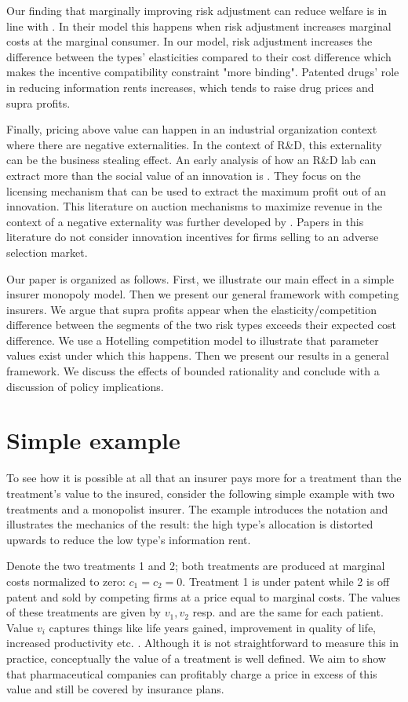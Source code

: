 \documentclass[12pt,english,a4paper]{article}
\begin{document}
Our finding that marginally improving risk adjustment can reduce welfare is in line with \cite{weyl2017}. In their model this happens when risk adjustment increases marginal costs at the marginal consumer. In our model, risk adjustment increases the difference between the types' elasticities  compared to their cost difference which makes the incentive compatibility constraint "more binding". Patented drugs' role in reducing information rents increases, which tends to raise drug prices and supra profits.

Finally, pricing above value can happen in an industrial organization context where there are negative externalities. In the context of R\&D, this externality can be the business stealing effect. An early analysis of how an R\&D lab can extract more than the social value of an innovation is \cite{KatzShapiro1986}. They focus on the licensing mechanism that can be used to extract the maximum profit out of an innovation. This literature on auction mechanisms to maximize revenue in the context of a negative externality was further developed by \cite{jehiel1996}. Papers in this literature do not consider innovation incentives for firms selling to an adverse selection market.

Our paper is organized as follows. First, we illustrate our main effect in a simple insurer monopoly model. Then we present our general framework with competing insurers. We argue that supra profits appear when the elasticity/competition difference between the segments of the two risk types exceeds their expected cost difference. We use a Hotelling competition model to illustrate that parameter values exist under which this happens. Then we present our results in a general framework. We discuss the effects of bounded rationality and conclude with a discussion of policy implications.

\section{Simple example}
\label{sec:org07cb506}

To see how it is possible at all that an insurer pays more for a treatment than the treatment's value to the insured, consider the following simple example with two treatments and a monopolist insurer. The example introduces the notation and illustrates the mechanics of the result: the high type's allocation is distorted upwards to reduce the low type's information rent. 

Denote the two treatments 1 and 2; both treatments are produced at marginal costs normalized to zero: \(c_1 = c_2 =0\). Treatment 1 is under patent while 2 is off patent and sold by competing firms at a price equal to marginal costs. The values of these treatments are given by \(v_1,v_2\) resp. and are the same for each patient. Value \(v_i\) captures things like life years gained, improvement in quality of life, increased productivity etc. \citep{Garrison2017}. Although it is not straightforward to measure this in practice, conceptually the value of a treatment is well defined. We aim to show that pharmaceutical companies can profitably charge a price in excess of this value and still be covered by insurance plans.
\end{document}
